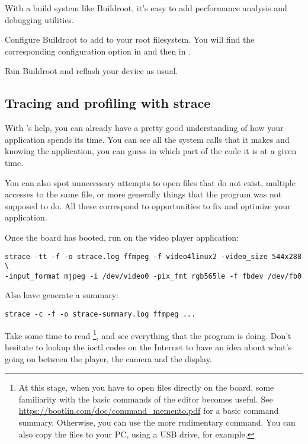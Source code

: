With a build system like Buildroot, it's easy to add performance
analysis and debugging utilities.

Configure Buildroot to add  to your root
filesystem. You will find the corresponding configuration option in
 and then in .

Run Buildroot and reflash your device as usual.

\subsection{Tracing and profiling with strace}

With 's help, you can already have a pretty good understanding
of how your application spends its time. You can see all the system
calls that it makes and knowing the application, you can guess in which
part of the code it is at a given time.

You can also spot unnecessary attempts to open files that do not exist,
multiple accesses to the same file, or more generally things that the
program was not supposed to do. All these correspond to opportunities
to fix and optimize your application.

Once the board has booted, run  on the video player
application:

\begin{verbatim}
strace -tt -f -o strace.log ffmpeg -f video4linux2 -video_size 544x288 \
-input_format mjpeg -i /dev/video0 -pix_fmt rgb565le -f fbdev /dev/fb0
\end{verbatim}

Also have  generate a summary:

\begin{verbatim}
strace -c -f -o strace-summary.log ffmpeg ...
\end{verbatim}

Take some time to read \footnote{
At this stage, when you have to open files directly on the
board, some familiarity with the basic commands of the  editor
becomes useful. See
\url{https://bootlin.com/doc/command_memento.pdf} for a basic
command summary. Otherwise, you can use the more rudimentary 
command. You can also copy the files to your PC, using a USB drive, for
example.}, and see everything that the program is doing. Don't hesitate
to lookup the ioctl codes on the Internet to have an idea about what's
going on between the player, the camera and the display.

